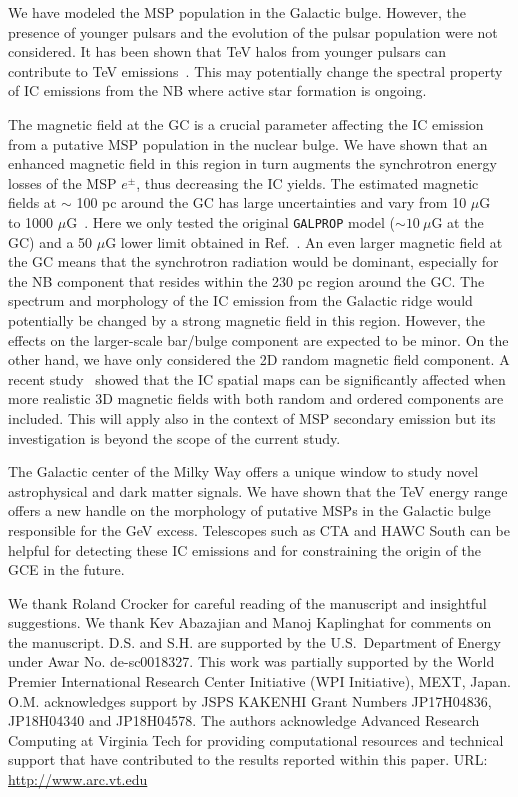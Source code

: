 \documentclass[%
reprint,
superscriptaddress,
amsmath,amssymb,
aps,
floatfix,
]{revtex4-1}
\begin{document}
We have modeled the MSP population in the Galactic bulge. However, the presence of younger pulsars and the evolution of the pulsar population were not considered. It has been shown that TeV halos from younger pulsars can contribute to TeV emissions~\cite{Hooper:2017rzt}. This may potentially change the spectral property of IC emissions from the NB where active star formation is ongoing.

The magnetic field at the GC is a crucial parameter affecting the IC emission from a putative MSP population in the nuclear bulge. We have shown that an enhanced magnetic field in this region in turn augments the synchrotron energy losses of the MSP $e^\pm$, thus decreasing the IC yields. The estimated magnetic fields at $\sim$ 100 pc around the GC has large uncertainties and vary from 10 $\mu$G~\cite{LaRosa:2005ai} to 1000 $\mu$G~\cite{Morris1989fd}. Here we only tested the original \texttt{GALPROP} model ($\sim 10\ \mu$G at the GC) and a 50 $\mu$G lower limit obtained in Ref.~\cite{Crocker:2010xc}. An even larger magnetic field at the GC means that the synchrotron radiation would be dominant, especially for the NB component that resides within the 230 pc region around the GC. The spectrum and morphology of the IC emission from the Galactic ridge would potentially be changed by a strong magnetic field in this region. However, the effects on the larger-scale bar/bulge component are expected to be minor. On the other hand, we have only considered the 2D random magnetic field component. A recent study~\cite{Orlando:2019vmq} showed that the IC spatial maps can be significantly affected when more realistic 3D magnetic fields with both random and ordered components are included. This will apply also in the context of MSP secondary emission but its investigation is beyond the scope of the current study.

The Galactic center of the Milky Way offers a unique window to study novel astrophysical and dark matter signals. We have shown that the TeV energy range offers a new handle on the morphology of putative MSPs in the Galactic bulge responsible for the GeV excess. Telescopes such as CTA and HAWC South can be helpful for detecting these IC emissions and for constraining the origin of the GCE in the future.

\begin{acknowledgments}

We thank Roland Crocker for careful reading of the manuscript and insightful suggestions. We thank Kev Abazajian and  Manoj Kaplinghat for comments on the manuscript. D.S. and S.H. are supported by the U.S.~Department of Energy under Awar No. de-sc0018327. This work was partially supported by the World Premier International Research Center Initiative (WPI Initiative), MEXT, Japan. O.M. acknowledges support by JSPS KAKENHI Grant Numbers JP17H04836, JP18H04340 and JP18H04578. The authors acknowledge Advanced Research Computing at Virginia Tech for providing computational resources and technical support that have contributed to the results reported within this paper. URL: \url{http://www.arc.vt.edu}

\end{acknowledgments}


\end{document}
